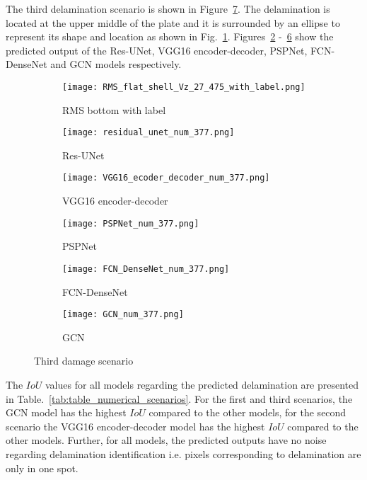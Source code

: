 \clearpage
The third delamination scenario is shown in Figure~\ref{fig:475_softmax}. 
The delamination is located at the upper middle of the plate and it is surrounded by an ellipse to represent its shape and location as shown in Fig.~\ref{fig:RMS_flat_shell_Vz_475}.
Figures~\ref{fig:Unet_Pred__softmax_475} -~\ref{fig:gcn_pred_475} show the predicted output of the Res-UNet, VGG16 encoder-decoder, PSPNet, FCN-DenseNet and GCN models respectively. 
\begin{figure}[!h]
	\centering
	\begin{subfigure}[b]{0.47\textwidth}
		\centering
		\texttt{[image: RMS\_flat\_shell\_Vz\_27\_475\_with\_label.png]}
		\caption{RMS bottom with label}
		\label{fig:RMS_flat_shell_Vz_475}
	\end{subfigure}
	\hfill
	\begin{subfigure}[b]{0.47\textwidth}
		\centering
		\texttt{[image: residual\_unet\_num\_377.png]}
		\caption{Res-UNet}
		\label{fig:Unet_Pred__softmax_475}
	\end{subfigure}
	\hfill
	\begin{subfigure}[b]{0.47\textwidth}
		\centering
		\texttt{[image: VGG16\_ecoder\_decoder\_num\_377.png]}
		\caption{VGG16 encoder-decoder}			\label{fig:vgg16_pred__softmax_475}			
	\end{subfigure}
	\hfill
	\begin{subfigure}[b]{0.47\textwidth}
		\centering
		\texttt{[image: PSPNet\_num\_377.png]}
		\caption{PSPNet}
		\label{fig:pspnet_pred__softmax_475}
	\end{subfigure}	
	\hfill
	\begin{subfigure}[b]{0.47\textwidth}
		\centering
		\texttt{[image: FCN\_DenseNet\_num\_377.png]}
		\caption{FCN-DenseNet}
		\label{fig:fcn_densenet_pred__softmax_475}
	\end{subfigure}
	\hfill
	\begin{subfigure}[b]{0.47\textwidth}
		\centering
		\texttt{[image: GCN\_num\_377.png]}
		\caption{GCN}
		\label{fig:gcn_pred_475}
	\end{subfigure}	
	\caption{Third damage scenario}
	\label{fig:475_softmax}
\end{figure}
\clearpage
The \(IoU\) values for all models regarding the predicted delamination are presented in Table.~\ref{tab:table_numerical_scenarios}.
For the first and third scenarios, the GCN model has the highest \(IoU\) compared to the other models, for the second scenario the VGG16 encoder-decoder model has the highest \(IoU\) compared to the other models.
Further, for all models, the predicted outputs have no noise regarding delamination identification i.e. pixels corresponding to delamination are only in one spot.


